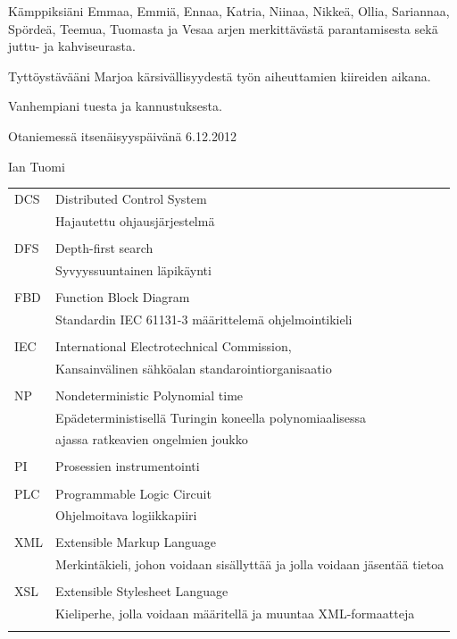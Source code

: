 \documentclass[finnish,12pt]{article}
\begin{document}
Kämppiksiäni Emmaa, Emmiä, Ennaa, Katria, Niinaa, Nikkeä, Ollia, Sariannaa, Spördeä, Teemua, Tuomasta ja Vesaa arjen merkittävästä parantamisesta sekä juttu- ja kahviseurasta.

Tyttöystävääni Marjoa kärsivällisyydestä työn aiheuttamien kiireiden aikana.

Vanhempiani tuesta ja kannustuksesta.

	\vspace{5cm}

Otaniemessä itsenäisyyspäivänä 6.12.2012

\vspace{1mm}
	{\hfill Ian Tuomi \hspace{1cm}}

	\newpage

	\tableofcontents




	\begin{tabular}{ll}	     	    
DCS	& Distributed Control System \\
	& Hajautettu ohjausjärjestelmä \\ \\
DFS	& Depth-first search\\
	& Syvyyssuuntainen läpikäynti \\\\

FBD	& Function Block Diagram\\
	& Standardin IEC 61131-3 määrittelemä ohjelmointikieli\\\\
IEC	& International Electrotechnical Commission,\\
	& Kansainvälinen sähköalan standarointiorganisaatio\\\\
NP & Nondeterministic Polynomial time\\
	& Epädeterministisellä Turingin koneella polynomiaalisessa\\&ajassa ratkeavien ongelmien joukko \\\\ 
PI	& Prosessien instrumentointi\\\\
PLC	& Programmable Logic Circuit \\
	& Ohjelmoitava logiikkapiiri\\\\
XML	& Extensible Markup Language\\
	& Merkintäkieli, johon voidaan sisällyttää ja jolla voidaan jäsentää tietoa  \\\\
XSL	& Extensible Stylesheet Language\\
	& Kieliperhe, jolla voidaan määritellä ja muuntaa XML-formaatteja\\\\


\end{tabular}
\end{document}
